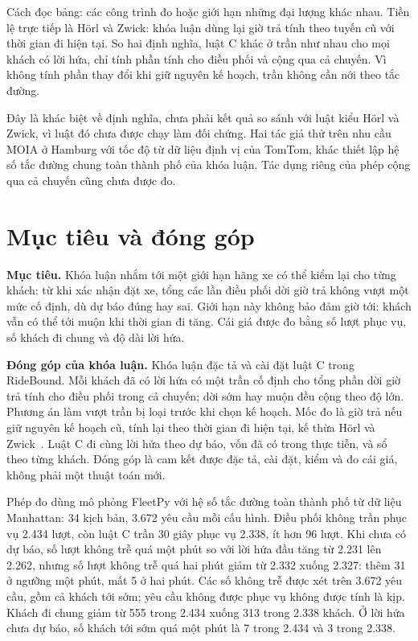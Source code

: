 Cách đọc bảng: các công trình đo hoặc giới hạn những đại lượng khác nhau. Tiền lệ trực tiếp là Hörl và
Zwick: khóa luận dùng lại giờ trả tính theo tuyến cũ với thời gian đi hiện tại. So hai định nghĩa, luật C
khác ở trần như nhau cho mọi khách có lời hứa, chỉ tính phần tính cho điều phối và cộng qua cả chuyến.
Vì không tính phần thay đổi khi giữ nguyên kế hoạch, trần không cần nới theo tắc đường.

Đây là khác biệt về định nghĩa, chưa phải kết quả so sánh với luật kiểu Hörl và Zwick, vì luật đó chưa được
chạy làm đối chứng. Hai tác giả thử trên nhu cầu MOIA ở Hamburg với tốc độ từ dữ liệu định vị của TomTom,
khác thiết lập hệ số tắc đường chung toàn thành phố của khóa luận. Tác dụng riêng của phép cộng qua cả
chuyến cũng chưa được đo.

\section{Mục tiêu và đóng góp}
\label{muc:c1-donggop}

\noindent\textbf{Mục tiêu.} Khóa luận nhắm tới một giới hạn hãng xe có thể kiểm lại cho từng khách: từ khi
xác nhận đặt xe, tổng các lần điều phối dời giờ trả không vượt một mức cố định, dù dự báo đúng hay sai.
Giới hạn này không bảo đảm giờ tới: khách vẫn có thể tới muộn khi thời gian đi tăng. Cái giá được đo bằng
số lượt phục vụ, số khách đi chung và độ dài lời hứa.

\noindent\textbf{Đóng góp của khóa luận.} Khóa luận đặc tả và cài đặt luật C trong RideBound. Mỗi khách đã
có lời hứa có một trần cố định cho tổng phần dời giờ trả tính cho điều phối trong cả chuyến; dời sớm hay
muộn đều cộng theo độ lớn. Phương án làm vượt trần bị loại trước khi chọn kế hoạch. Mốc đo là giờ trả nếu
giữ nguyên kế hoạch cũ, tính lại theo thời gian đi hiện tại, kế thừa Hörl và Zwick~\cite{horl2022}.
Luật C đi cùng lời hứa theo dự báo, vốn đã có trong thực tiễn, và sổ theo từng khách. Đóng góp là cam kết
được đặc tả, cài đặt, kiểm và đo cái giá, không phải một thuật toán mới.

Phép đo dùng mô phỏng FleetPy với hệ số tắc đường toàn thành phố từ dữ liệu Manhattan: 34 kịch bản,
3.672 yêu cầu mỗi cấu hình. Điều phối không trần phục vụ 2.434 lượt, còn luật C trần 30 giây phục vụ
2.338, ít hơn 96 lượt. Khi chưa có dự báo, số lượt không trễ quá một phút so với lời hứa đầu tăng từ
2.231 lên 2.262, nhưng số lượt không trễ quá hai phút giảm từ 2.332 xuống 2.327: thêm 31 ở ngưỡng một
phút, mất 5 ở hai phút. Các số không trễ được xét trên 3.672 yêu cầu, gồm cả khách tới sớm; yêu cầu không
được phục vụ không được tính là kịp. Khách đi chung giảm từ 555 trong 2.434 xuống 313 trong 2.338 khách.
Ở lời hứa chưa dự báo, số khách tới sớm quá một phút là 7 trong 2.434 và 3 trong 2.338.

